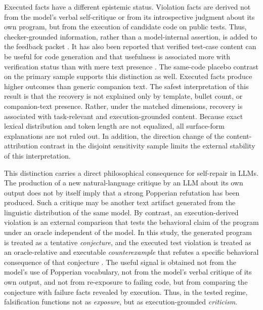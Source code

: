 \documentclass{article}
\numberwithin{equation}{section}  %
\theoremstyle{definition}
\begin{document}
Executed facts have a different epistemic status. Violation facts are derived not from the
model's verbal self-critique or from its introspective judgment about its own program, but from
the execution of candidate code on public tests. Thus, checker-grounded information, rather
than a model-internal assertion, is added to the feedback packet
\citep{huang2024cannot,olausson2024selfrepair}. It has also been reported that verified
test-case content can be useful for code generation \citep{rizqullah2026tdp} and that
usefulness is associated more with verification status than with mere text presence
\citep{zhang2023algo}. The same-code placebo contrast on the primary sample supports this
distinction as well. Executed facts produce higher outcomes than generic companion text. The
safest interpretation of this result is that the recovery is not explained only by template,
bullet count, or companion-text presence. Rather, under the matched dimensions, recovery is
associated with task-relevant and execution-grounded content. Because exact lexical
distribution and token length are not equalized, all surface-form explanations are not ruled
out. In addition, the direction change of the content-attribution contrast in the disjoint
sensitivity sample limits the external stability of this interpretation.

This distinction carries a direct philosophical consequence for self-repair in LLMs. The
production of a new natural-language critique by an LLM about its own output does not by
itself imply that a strong Popperian refutation has been produced. Such a critique may be
another text artifact generated from the linguistic distribution of the same model. By
contrast, an execution-derived violation is an external comparison that tests the behavioral
claim of the program under an oracle independent of the model. In this study, the generated
program is treated as a tentative \emph{conjecture}, and the executed test violation is
treated as an oracle-relative and executable \emph{counterexample} that refutes a specific
behavioral consequence of that conjecture
\citep{popper1959logic,popper1963conjectures}. The useful signal is obtained not from the
model's use of Popperian vocabulary, not from the model's verbal critique of its own output,
and not from re-exposure to failing code, but from comparing the conjecture with failure facts
revealed by execution. Thus, in the tested regime, falsification functions not as
\emph{exposure}, but as execution-grounded \emph{criticism}.
\end{document}
